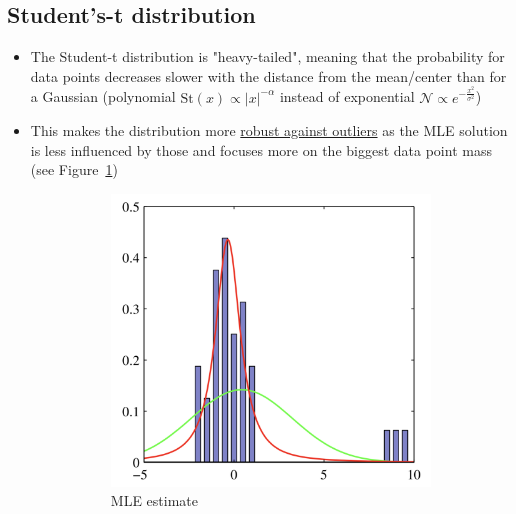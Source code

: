 \subsection{Student's-t distribution}
\begin{itemize}
	\item The Student-t distribution is "heavy-tailed", meaning that the probability for data points decreases slower with the distance from the mean/center than for a Gaussian (polynomial $\text{St}(x)\propto |x|^{-\alpha}$ instead of exponential $\mathcal{N}\propto e^{-\frac{x^2}{\sigma^2}}$)
	\item This makes the distribution more \underline{robust against outliers} as the MLE solution is less influenced by those and focuses more on the biggest data point mass (see Figure~\ref{fig:exponential_families_student_t})
	\begin{figure}[ht!]
		\centering
		\begin{subfigure}{0.25\textwidth}
			\centering
			\includegraphics[width=\textwidth]{figures/exponential_families_student_t.png}
			\caption{MLE estimate}
			\label{fig:exponential_families_student_t}
		\end{subfigure}
		\hspace{10mm}
		\begin{subfigure}{0.3\textwidth}
			\centering

\end{subfigure}
\end{figure}
\end{itemize}
